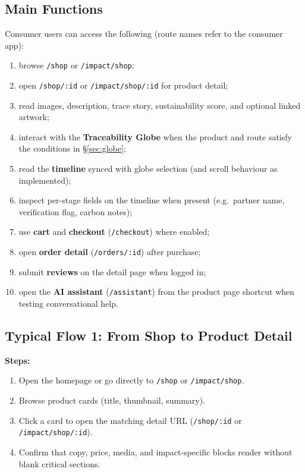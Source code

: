 \documentclass[11pt]{article}
\begin{document}
\subsection{Main Functions}
Consumer users can access the following (route names refer to the consumer app):
\begin{enumerate}[leftmargin=2.2em]
    \item browse \texttt{/shop} or \texttt{/impact/shop};
    \item open \texttt{/shop/:id} or \texttt{/impact/shop/:id} for product detail;
    \item read images, description, trace story, sustainability score, and optional linked artwork;
    \item interact with the \textbf{Traceability Globe} when the product and route satisfy the conditions in \S\ref{sec:globe};
    \item read the \textbf{timeline} synced with globe selection (and scroll behaviour as implemented);
    \item inspect per-stage fields on the timeline when present (e.g.\ partner name, verification flag, carbon notes);
    \item use \textbf{cart} and \textbf{checkout} (\texttt{/checkout}) where enabled;
    \item open \textbf{order detail} (\texttt{/orders/:id}) after purchase;
    \item submit \textbf{reviews} on the detail page when logged in;
    \item open the \textbf{AI assistant} (\texttt{/assistant}) from the product page shortcut when testing conversational help.
\end{enumerate}

\subsection{Typical Flow 1: From Shop to Product Detail}
\textbf{Steps:}
\begin{enumerate}[leftmargin=2.2em]
    \item Open the homepage or go directly to \texttt{/shop} or \texttt{/impact/shop}.
    \item Browse product cards (title, thumbnail, summary).
    \item Click a card to open the matching detail URL (\texttt{/shop/:id} or \texttt{/impact/shop/:id}).
    \item Confirm that copy, price, media, and impact-specific blocks render without blank critical sections.
\end{enumerate}
\end{document}
